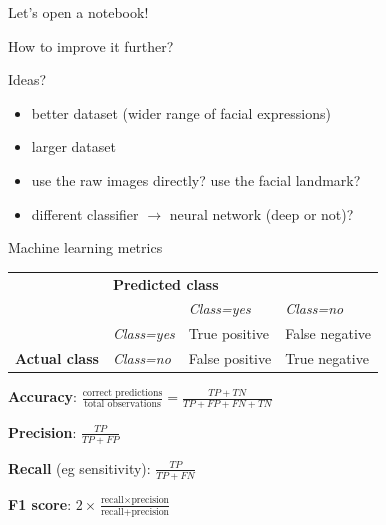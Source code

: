 \documentclass[compress,xcolor=table]{beamer}
\begin{document}
\begin{frame}[plain]
    \begin{center}
    \Large Let's open a notebook!
    \end{center}
\end{frame}

\begin{frame}{How to improve it further?}

    \begin{center}
        Ideas?
    \end{center}

    \pause

    \begin{itemize}
        \item better dataset (wider range of facial expressions)
        \item larger dataset
        \item use the raw images directly? use the facial landmark?
        \item different classifier $\rightarrow$ neural network (deep or not)?
    \end{itemize}

\end{frame}


\begin{frame}{Machine learning metrics}

\begin{table}[]
\begin{tabular}{llll}
                      & \multicolumn{3}{l}{\textbf{Predicted class}} \\ \cline{2-4} 
\multicolumn{1}{l|}{} &         & \it Class=yes        & \it Class=no        \\ \cline{3-4} 
\multicolumn{1}{l|}{} &
  \multicolumn{1}{l|}{\it Class=yes} &
  \cellcolor[HTML]{9AFF99}True positive &
  \cellcolor[HTML]{FFCCC9}False negative \\
\multicolumn{1}{l|}{\multirow{-3}{*}{\textbf{Actual class}}} &
  \multicolumn{1}{l|}{\it Class=no} &
  \cellcolor[HTML]{FFCCC9}False positive &
  \cellcolor[HTML]{9AFF99}True negative
\end{tabular}
\end{table}


    \textbf{Accuracy}: $\frac{\text{correct predictions}}{\text{total
    observations}}=\frac{TP+TN}{TP+FP+FN+TN}$

    \textbf{Precision}: $\frac{TP}{TP+FP}$

    \textbf{Recall} (eg sensitivity): $\frac{TP}{TP+FN}$

    \textbf{F1 score}: $2\times\frac{\text{recall} \times
    \text{precision}}{\text{recall} + \text{precision}}$

\end{frame}
\end{document}
